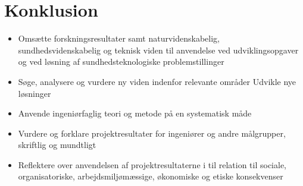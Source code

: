 \chapter{Konklusion}
\begin{itemize}
	\item Omsætte forskningsresultater samt naturvidenskabelig, sundhedsvidenskabelig og teknisk viden til anvendelse ved udviklingsopgaver og ved løsning af sundhedsteknologiske problemstillinger
	\item Søge, analysere og vurdere ny viden indenfor relevante områder
	Udvikle nye løsninger
	\item Anvende ingeniørfaglig teori og metode på en systematisk måde
	\item Vurdere og forklare projektresultater for ingeniører og andre målgrupper, skriftlig og mundtligt
	
	\item Reflektere over anvendelsen af projektresultaterne i til relation til sociale, organisatoriske, arbejdsmiljømæssige, økonomiske og etiske konsekvenser
\end{itemize}




